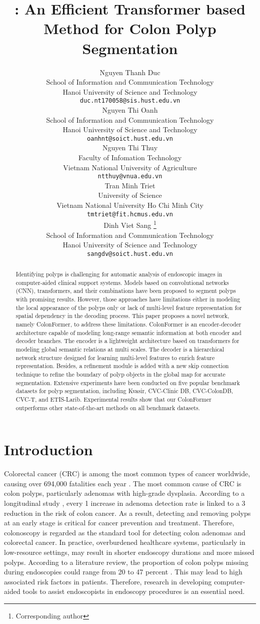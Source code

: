 \documentclass{article}
\title{\ModelName: An Efficient Transformer based Method for Colon Polyp Segmentation}
\author{{Nguyen Thanh Duc} \\
School of Information and Communication Technology\\
Hanoi University of Science and Technology\\
\texttt{duc.nt170058@sis.hust.edu.vn} \\
\And
{Nguyen Thi Oanh} \\
School of Information and Communication Technology\\
Hanoi University of Science and Technology\\
\texttt{oanhnt@soict.hust.edu.vn} \\
\And
{Nguyen Thi Thuy} \\
Faculty of Infomation Technology\\
Vietnam National University of Agriculture\\
\texttt{ntthuy@vnua.edu.vn} \\
\And
{Tran Minh Triet} \\
University of Science\\
Vietnam National University Ho Chi Minh City\\
\texttt{tmtriet@fit.hcmus.edu.vn} \\
\And
{Dinh Viet Sang} \thanks{Corresponding author}\\
School of Information and Communication Technology\\
Hanoi University of Science and Technology\\
\texttt{sangdv@soict.hust.edu.vn} \\
}
\begin{document}
\maketitle

\begin{abstract}
Identifying polyps is challenging for automatic analysis of endoscopic images in computer-aided clinical support systems.
Models based on convolutional networks (CNN), transformers, and their combinations have been proposed to segment polyps with promising results. However, those approaches have limitations either in modeling the local appearance of the polyps only or lack of multi-level feature representation for spatial dependency in the decoding process.  
This paper proposes a novel network, namely ColonFormer, to address these limitations.
ColonFormer is an encoder-decoder architecture capable of modeling long-range semantic information at both encoder and decoder branches. The encoder is a lightweight architecture based on transformers for modeling global semantic relations at multi scales. The decoder is a hierarchical network structure designed for learning multi-level features to enrich feature representation. Besides, a refinement module is added with a new skip connection technique to refine the boundary of polyp objects in the global map for accurate segmentation.
Extensive experiments have been conducted on five popular benchmark datasets for polyp segmentation, including Kvasir, CVC-Clinic DB, CVC-ColonDB, CVC-T, and ETIS-Larib. Experimental results show that our ColonFormer outperforms other state-of-the-art methods on all benchmark datasets.
\end{abstract}






\section{Introduction}
\label{sec:introduction}
Colorectal cancer (CRC) is among the most common types of cancer worldwide, causing over 694,000 fatalities each year \cite{bernal2017comparative}.
The most common cause of CRC is colon polyps, particularly adenomas with high-grade dysplasia. According to a longitudinal study \cite{corley2014adenoma}, every 1 increase in adenoma detection rate is linked to a 3 reduction in the risk of colon cancer. As a result, detecting and removing polyps at an early stage is critical for cancer prevention and treatment. Therefore, colonoscopy is regarded as the standard tool for detecting colon adenomas and colorectal cancer.
In practice, overburdened healthcare systems, particularly in low-resource settings, may result in shorter endoscopy durations and more missed polyps.  According to a literature review, the proportion of colon polyps missing during endoscopies could range from 20 to 47 percent \cite{leufkens2012factors}. This may lead to high associated risk factors in patients. Therefore, research in developing computer-aided tools to assist endoscopists in endoscopy procedures is an essential need. 
\end{document}
